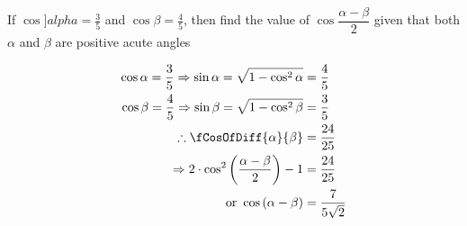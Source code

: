 
%
%
%
%
% 
% 
\question[3] If $\cos]alpha = \frac{3}{5}$ and $\cos\beta = \frac{4}{5}$, then find the 
value of $\cos\dfrac{\alpha-\beta}{2}$ given that both $\alpha$ and $\beta$ are positive
acute angles


\ifprintanswers
\fi 

\begin{solution}[\halfpage]
	\begin{align}
	   \cos\alpha = \dfrac{3}{5} \Rightarrow \sin\alpha = \sqrt{1-\cos^2\alpha} &= \dfrac{4}{5} \\
	   \cos\beta = \dfrac{4}{5} \Rightarrow \sin\beta = \sqrt{1-\cos^2\beta} &= \dfrac{3}{5} \\
	   \therefore \fCosOfDiff{\alpha}{\beta} &= \dfrac{24}{25} \\
	   \Rightarrow 2\cdot\cos^2\left( \dfrac{\alpha-\beta}{2}\right) - 1 &= \dfrac{24}{25} \\
	   \text{ or } \cos\left(\alpha-\beta \right) &= \dfrac{7}{5\sqrt2}
	\end{align}
\end{solution}
